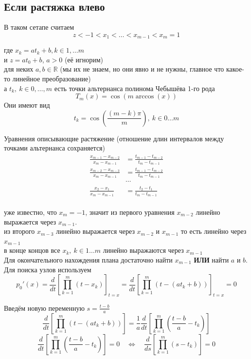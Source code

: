 \documentclass[12pt,a4paper]{article}
\begin{document}
	
	
	
	\newpage
	\subsection*{Если растяжка влево}
	
	\noindent В таком сетапе считаем
	\[
	z < -1 < x_1 < \ldots < x_{m-1} < x_m = 1
	\]
	
	\noindent где $x_k = a t_{k} + b, k \in 1, \ldots m$ \\
	и $z=a t_0 + b$, $a > 0$ (её игнорим)\\
	для неких $a, b \in \mathbb{R}$ (мы их не знаем, но они явно и не нужны, главное что какое-то линейное преобразование) \\
	а $t_k, \  k \in 0, \ldots, m$ есть точки альтернанса полинома Чебышёва 1-го рода 
	\[
	T_{m}(x) = \cos( m \arccos(x))
	\]
	\noindent Они имеют вид 
	\[
	t_k = \cos \left( \frac{ (m-k) \pi}{m} \right), \ k \in 0 \ldots m
	\]
	
	\noindent Уравнения описывающие растяжение (отношение длин интервалов между точками альтернанса сохраняется)
	\begin{align*}
		\frac{x_{m-1} - x_{m-2}}{x_m - x_{m-1}} &= \frac{t_{m-1} - t_{m-2}}{t_m - t_{m-1}}\\[0.1in]
		\frac{x_{m-2} - x_{m-3}}{x_m - x_{m-1}} &= \frac{t_{m-1} - t_{m-2}}{t_m - t_{m-1}}\\[0.1in]
		&\cdots\\[0.1in]
		\frac{x_2 - x_1}{x_m - x_{m-1}} &= \frac{t_2 - t_1}{t_m - t_{m-1}}\\
	\end{align*}
	
	\noindent уже известно, что $x_m = -1$, значит из первого уравнения $x_{m-2}$ линейно выражается через $x_{m-1}$.\\
	из второго $x_{m-3}$ линейно выражается через $x_{m-2}$ и $x_{m-1}$ то есть линейно через $x_{m-1}$\\
	в конце концов все $x_k, \ k \in 1 \ldots m $ линейно выражаются через $x_{m-1}$\\
	Для окончательного нахождения плана достаточно найти $x_{m-1}$ \textbf{ИЛИ} найти $a$ и $b$.\\
	
	
	\noindent Для поиска узлов используем
	\[
	p_0'(x) = 
	\frac{d}{dt} \left[\prod_{k=1}^{m} (t - x_k) \right]_{t=x} = 
	\frac{d}{dt} \left[\prod_{k=1}^{m} (t - (at_{k} + b) ) \right]_{t=x} = 
	0
	\]
	
	\noindent Введём новую переменную $s = \frac{t-b}{a}$
	\[
	\frac{d}{dt} \left[\prod_{k=1}^{m} (t - (at_{k} + b) ) \right] =
	\frac{1}{a}\frac{d}{dt} \left[\prod_{k=1}^{m} \left( \frac{t-b}{a} - t_{k} \right) \right] 
	\]
	\[
	\frac{d}{dt} \left[\prod_{k=1}^{m} \left( \frac{t-b}{a} - t_{k} \right) \right] = 0 
	\quad \Longleftrightarrow \quad
	\frac{d}{ds} \left[\prod_{k=1}^{m} \left( s - t_{k} \right) \right] = 0
	\]
	
\end{document}
